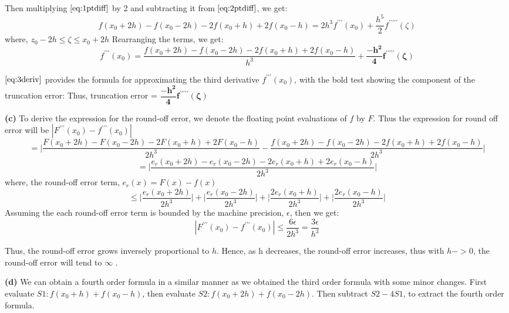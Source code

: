 \documentclass{article}
\renewcommand\part[1]{\vspace{.10in}\textbf{(#1)}}
\begin{document}
  Then multiplying $\eqref{eq:1ptdiff}$ by 2 and subtracting it from $\eqref{eq:2ptdiff}$, we get:
  \[ f(x_0 + 2h) - f(x_0 - 2h) - 2f(x_0 + h) + 2f(x_0-h) = 2h^3f^{\prime\prime\prime}(x_0) + \dfrac{h^5}{2}f^{\prime\prime\prime\prime\prime}(\zeta) \]
  where, $z_0 - 2h \leq \zeta \leq x_0 + 2h$
  Rearranging the terms, we get:
  \begin{equation}
	  f^{\prime\prime\prime}(x_0) = \dfrac{f(x_0 + 2h) - f(x_0 - 2h) - 2f(x_0 + h) + 2f(x_0-h)}{h^3} + \mathbf{\dfrac{-h^2}{4}f^{\prime\prime\prime\prime\prime}(\zeta)}
	  \label{eq:3deriv}
  \end{equation}

  $\eqref{eq:3deriv}$ provides the formula for approximating the third derivative $f^{\prime\prime\prime}(x_0)$, with the bold test showing the component of the truncation error:
  Thus, truncation error = $\mathbf{\dfrac{-h^2}{4}f^{\prime\prime\prime\prime\prime}(\zeta)}$

  \part{c} To derive the expression for the round-off error, we denote the floating point evaluations of $f$ by $F$. Thus the expression for round off error will be $|F^{\prime\prime\prime}(x_0) - f^{\prime\prime\prime}(x_0)|$ \[ = \bigg |  \dfrac{F(x_0 + 2h) - F(x_0 - 2h) - 2F(x_0 + h) + 2F(x_0-h)}{2h^3} - \dfrac{f(x_0 + 2h) - f(x_0 - 2h) - 2f(x_0 + h) + 2f(x_0-h)}{2h^3} \bigg |\]
  \[= \bigg |  \dfrac{e_r(x_0+2h) - e_r(x_0-2h) -2e_r(x_0+h) + 2e_r(x_0-h)}{2h^3}  \bigg |\]
  where, the round-off error term, $e_r(x) = F(x) - f(x)$
  \[\leq \bigg | \dfrac{e_r(x_0 + 2h)}{2h^3}\bigg | + \bigg | \dfrac{e_r(x_0 - 2h)}{2h^3}\bigg | + \bigg | \dfrac{2e_r(x_0 + h)}{2h^3}\bigg | + \bigg | \dfrac{2e_r(x_0 - h)}{2h^3}\bigg |\]
  Assuming the each round-off error term is bounded by the machine precision, $\epsilon$, then we get:
  \[ |F^{\prime\prime\prime}(x_0) - f^{\prime\prime\prime}(x_0)| \leq \dfrac{6\epsilon}{2h^3} = \dfrac{3\epsilon}{h^3} \]

  Thus, the round-off error grows inversely proportional to $h$. Hence, as h decreases, the round-off error increases, thus with $h->0$, the round-off error will tend to $\infty$ .

  \part{d} We can obtain a fourth order formula in a similar manner as we obtained the third order formula with some minor changes. First evaluate $S1: f(x_0 + h) + f(x_0 - h)$, then evaluate $S2: f(x_0 + 2h) + f(x_0 - 2h)$. Then subtract $S2 - 4S1$, to extract the fourth order formula.
\end{document}
